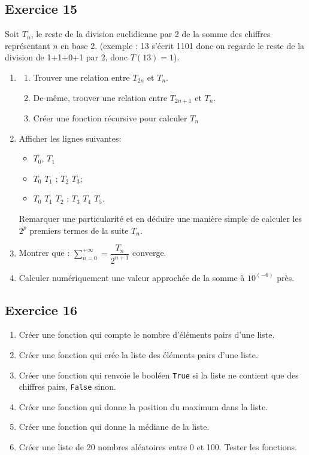 \documentclass[10pt,fleqn]{article} %
\begin{document}
\begin{multicols}{2}
\subsection*{Exercice 15}
Soit $T_n$, le reste de la division euclidienne par 2 de la somme des chiffres représentant $n$ en base 2.
(exemple : 13 s'écrit 1101 donc on regarde le reste de la division de 1+1+0+1 par 2, donc $T(13)=1$). 

\begin{enumerate} 
\item \begin{enumerate}
\item Trouver une relation entre $T_{2n}$ et $T_n$.
\item De-même, trouver une relation entre $T_{2n+1}$ et $T_n$.
\item Créer une fonction récursive pour calculer $T_n$
\end{enumerate}
\item Afficher les lignes suivantes: 
\begin{itemize}
\item $T_0$, $T_1$
\item $T_0$  $T_1$ ; $T_2$ $T_3$;
\item $T_0$ $T_1$ $T_2$    ; $T_3$ $T_4$ $T_5$.
\end{itemize} 
Remarquer une particularité et en déduire une manière simple de calculer les $2^p$ premiers termes de la suite $T_n$.
\item Montrer que : $\sum\limits_{n=0}^{+\infty} = \dfrac{T_n}{2^{n+1}}$ converge.
\item Calculer numériquement une valeur approchée de la somme à $10^(-6)$ près.
\end{enumerate}

\subsection*{Exercice 16}
\begin{enumerate}
\item Créer une fonction qui compte le nombre d'éléments pairs d'une liste. 
\item Créer une fonction qui crée la liste des éléments pairs d'une liste. 
\item Créer une fonction qui renvoie le booléen \texttt{True} si la liste ne contient que des chiffres pairs, \texttt{False} sinon. 
\item Créer une fonction qui donne la position du maximum dans la liste. 
\item Créer une fonction qui donne la médiane de la liste. 
\item Créer une liste de 20 nombres aléatoires entre 0 et 100. Tester les fonctions. 
\end{enumerate}


\end{multicols}
\end{document}
